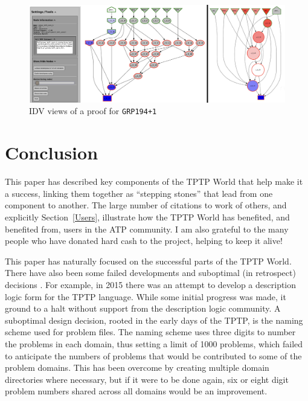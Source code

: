 \documentclass[runningheads]{llncs}
\begin{document}
\begin{figure}[htb]
\centering
\includegraphics[width=1.0\textwidth]{IDV.pdf}
\vspace*{-1em}
\caption{IDV views of a proof for {\tt GRP194+1}}
\label{IDV}
\end{figure}

\section{Conclusion}
\label{Conclusion}

This paper has described key components of the TPTP World that help make it a success,
linking them together as ``stepping stones'' that lead from one component to another.
The large number of citations to work of others, and explicitly Section~\ref{Users}, 
illustrate how the TPTP World has benefited, and benefited from, users in the ATP community.
I am also grateful to the many people who have donated hard cash to the project, helping
to keep it alive!

This paper has naturally focused on the successful parts of the TPTP World.
There have also been some failed developments and suboptimal (in retrospect) decisions \frownie{}.
For example, in 2015 there was an attempt to develop a description logic form for the TPTP 
language. 
While some initial progress was made, it ground to a halt without support from the description 
logic community.
A suboptimal design decision, rooted in the early days of the TPTP, is the naming scheme used for 
problem files. 
The naming scheme uses three digits to number the problems in each domain, thus setting a limit 
of 1000 problems, which failed to anticipate the numbers of problems that would be contributed 
to some of the problem domains.
This has been overcome by creating multiple domain directories where necessary, but if it were 
to be done again, six or eight digit problem numbers shared across all domains would be an 
improvement.
\end{document}
